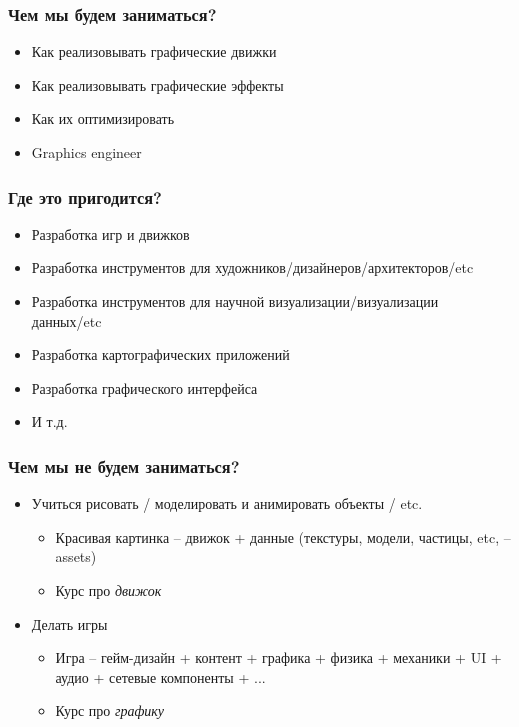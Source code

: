 \documentclass{beamer}
\begin{document}
\begin{frame}
\frametitle{Чем мы будем заниматься?}
\begin{itemize}
\pause
\item Как реализовывать графические движки
\pause
\item Как реализовывать графические эффекты
\pause
\item Как их оптимизировать
\pause
\item Graphics engineer
\end{itemize}
\end{frame}

\begin{frame}
\frametitle{Где это пригодится?}
\begin{itemize}
\pause
\item Разработка игр и движков
\pause
\item Разработка инструментов для художников/дизайнеров/архитекторов/etc
\pause
\item Разработка инструментов для научной визуализации/визуализации данных/etc
\pause
\item Разработка картографических приложений
\pause
\item Разработка графического интерфейса
\pause
\item И т.д.
\end{itemize}
\end{frame}

\begin{frame}
\frametitle{Чем мы \textbf{не} будем заниматься?}
\begin{itemize}
\pause
\item Учиться рисовать / моделировать и анимировать объекты / etc.
\pause
\begin{itemize}
\item Красивая картинка -- движок + данные (текстуры, модели, частицы, etc, -- assets)
\item Курс про \textit{движок}
\end{itemize}
\pause
\item Делать игры
\begin{itemize}
\item Игра -- гейм-дизайн + контент + графика + физика + механики + UI + аудио + сетевые компоненты + ...
\item Курс про \textit{графику}
\end{itemize}
\end{itemize}
\end{frame}
\end{document}
